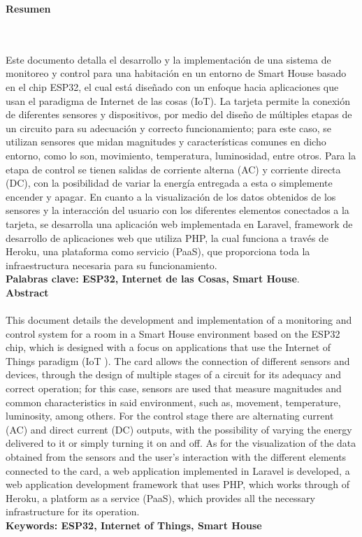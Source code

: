 \newpage
\thispagestyle{empty} \textbf{}\normalsize
\textbf{\LARGE Resumen}
\markboth{}{}
\\\\
Este documento detalla el desarrollo y la implementación de una sistema de monitoreo y control para una habitación en un entorno de Smart House basado en el chip ESP32, el cual está diseñado con un enfoque hacia aplicaciones que usan el paradigma de Internet de las cosas (IoT). La tarjeta permite la conexión de diferentes sensores y dispositivos, por medio del diseño de múltiples etapas de un circuito para su adecuación y correcto funcionamiento; para este caso, se utilizan sensores que midan magnitudes y características comunes en dicho entorno, como lo son, movimiento, temperatura, luminosidad, entre otros. Para la etapa de control se tienen salidas de corriente alterna (AC) y corriente directa (DC), con la posibilidad de variar la energía entregada a esta o simplemente encender y apagar. En cuanto a la visualización de los datos obtenidos de los sensores y la interacción del usuario con los diferentes elementos conectados a la tarjeta, se desarrolla una aplicación web implementada en Laravel, framework de desarrollo de aplicaciones web que utiliza PHP, la cual funciona a través de Heroku, una plataforma como servicio (PaaS), que proporciona toda la infraestructura necesaria para su funcionamiento.\\
\textbf{\small Palabras clave: ESP32, Internet de las Cosas, Smart House}.\\[1.0cm]
\textbf{\LARGE Abstract}\\\\
This document details the development and implementation of a monitoring and control system for a room in a Smart House environment based on the ESP32 chip, which is designed with a focus on applications that use the Internet of Things paradigm (IoT ). The card allows the connection of different sensors and devices, through the design of multiple stages of a circuit for its adequacy and correct operation; for this case, sensors are used that measure magnitudes and common characteristics in said environment, such as, movement, temperature, luminosity, among others. For the control stage there are alternating current (AC) and direct current (DC) outputs, with the possibility of varying the energy delivered to it or simply turning it on and off. As for the visualization of the data obtained from the sensors and the user's interaction with the different elements connected to the card, a web application implemented in Laravel is developed, a web application development framework that uses PHP, which works through of Heroku, a platform as a service (PaaS), which provides all the necessary infrastructure for its operation.\\[1.0cm]
\textbf{\small Keywords: ESP32, Internet of Things, Smart House}